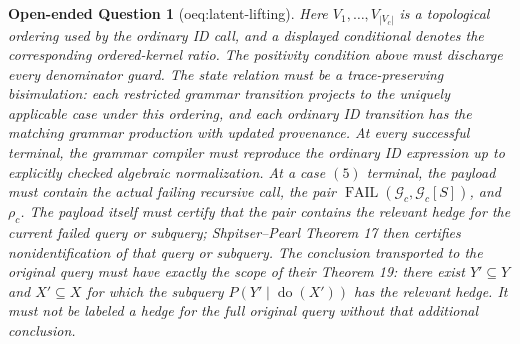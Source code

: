 \documentclass{article}
\newtheorem{openendedquestion}{Open-ended Question}
\begin{document}
\begin{openendedquestion}[oeq:latent-lifting]
Here \(V_1,\ldots,V_{|V_c|}\) is a topological ordering used by the ordinary ID call, and a displayed conditional denotes the corresponding ordered-kernel ratio. The positivity condition above must discharge every denominator guard. The state relation must be a trace-preserving bisimulation: each restricted grammar transition projects to the uniquely applicable case under this ordering, and each ordinary ID transition has the matching grammar production with updated provenance. At every successful terminal, the grammar compiler must reproduce the ordinary ID expression up to explicitly checked algebraic normalization. At a case \((5)\) terminal, the payload must contain the actual failing recursive call, the pair \(\operatorname{FAIL}(\mathcal G_c,\mathcal G_c[S])\), and \(\rho_c\). The payload itself must certify that the pair contains the relevant hedge for the current failed query or subquery; Shpitser--Pearl Theorem 17 then certifies nonidentification of that query or subquery. The conclusion transported to the original query must have exactly the scope of their Theorem 19: there exist \(Y'\subseteq Y\) and \(X'\subseteq X\) for which the subquery \(P(Y'\mid\operatorname{do}(X'))\) has the relevant hedge. It must not be labeled a hedge for the full original query without that additional conclusion.


\end{openendedquestion}
\end{document}
